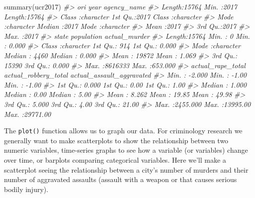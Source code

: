 \documentclass[
]{krantz}
\makeatletter
\newenvironment{Shaded}{\begin{snugshade}}{\end{snugshade}}
\newcommand{\CommentTok}[1]{\textcolor[rgb]{0.37,0.37,0.37}{\textit{#1}}}
\newcommand{\FunctionTok}[1]{\textcolor[rgb]{0,0,0}{#1}}
\newcommand{\NormalTok}[1]{#1}
\newenvironment{kframe}{%
\medskip{}
\setlength{\fboxsep}{.8em}
 \def\at@end@of@kframe{}%
 \ifinner\ifhmode%
  \def\at@end@of@kframe{\end{minipage}}%
  \begin{minipage}{\columnwidth}%
 \fi\fi%
 \def\FrameCommand##1{\hskip\@totalleftmargin \hskip-\fboxsep
 \colorbox{shadecolor}{##1}\hskip-\fboxsep
     \hskip-\linewidth \hskip-\@totalleftmargin \hskip\columnwidth}%
 \MakeFramed {\advance\hsize-\width
   \@totalleftmargin\z@ \linewidth\hsize
   \@setminipage}}%
 {\par\unskip\endMakeFramed%
 \at@end@of@kframe}
\renewenvironment{Shaded}{\begin{kframe}}{\end{kframe}}
\makeatother
\begin{document}
\begin{Shaded}
\begin{Highlighting}[]
\FunctionTok{summary}\NormalTok{(ucr2017)}
\CommentTok{\#\textgreater{}      ori                 year      agency\_name       }
\CommentTok{\#\textgreater{}  Length:15764       Min.   :2017   Length:15764      }
\CommentTok{\#\textgreater{}  Class :character   1st Qu.:2017   Class :character  }
\CommentTok{\#\textgreater{}  Mode  :character   Median :2017   Mode  :character  }
\CommentTok{\#\textgreater{}                     Mean   :2017                     }
\CommentTok{\#\textgreater{}                     3rd Qu.:2017                     }
\CommentTok{\#\textgreater{}                     Max.   :2017                     }
\CommentTok{\#\textgreater{}     state             population      actual\_murder    }
\CommentTok{\#\textgreater{}  Length:15764       Min.   :      0   Min.   :  0.000  }
\CommentTok{\#\textgreater{}  Class :character   1st Qu.:    914   1st Qu.:  0.000  }
\CommentTok{\#\textgreater{}  Mode  :character   Median :   4460   Median :  0.000  }
\CommentTok{\#\textgreater{}                     Mean   :  19872   Mean   :  1.069  }
\CommentTok{\#\textgreater{}                     3rd Qu.:  15390   3rd Qu.:  0.000  }
\CommentTok{\#\textgreater{}                     Max.   :8616333   Max.   :653.000  }
\CommentTok{\#\textgreater{}  actual\_rape\_total  actual\_robbery\_total actual\_assault\_aggravated}
\CommentTok{\#\textgreater{}  Min.   :  {-}2.000   Min.   :   {-}1.00     Min.   :   {-}1.00         }
\CommentTok{\#\textgreater{}  1st Qu.:   0.000   1st Qu.:    0.00     1st Qu.:    1.00         }
\CommentTok{\#\textgreater{}  Median :   1.000   Median :    0.00     Median :    5.00         }
\CommentTok{\#\textgreater{}  Mean   :   8.262   Mean   :   19.85     Mean   :   49.98         }
\CommentTok{\#\textgreater{}  3rd Qu.:   5.000   3rd Qu.:    4.00     3rd Qu.:   21.00         }
\CommentTok{\#\textgreater{}  Max.   :2455.000   Max.   :13995.00     Max.   :29771.00}
\end{Highlighting}
\end{Shaded}

The \texttt{plot()} function allows us to graph our data. For criminology research we generally want to make scatterplots to show the relationship between two numeric variables, time-series graphs to see how a variable (or variables) change over time, or barplots comparing categorical variables. Here we'll make a scatterplot seeing the relationship between a city's number of murders and their number of aggravated assaults (assault with a weapon or that causes serious bodily injury).
\end{document}
